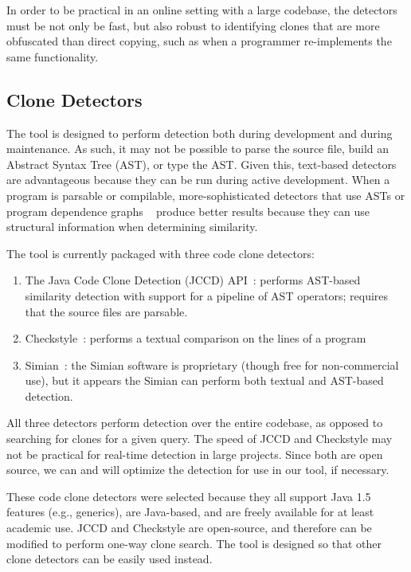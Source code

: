 \documentclass[nocopyrightspace,10pt]{sigplanconf}
\begin{document}
In order to be practical in an online
setting with a large codebase, the detectors must be
not only be fast, but also
robust to identifying clones that are more obfuscated than direct
copying, such as when a programmer re-implements the same
functionality.

\subsection{Clone Detectors}
The tool is designed to perform detection both during development and
during maintenance.  As such, it may not be possible to parse the source
file, build an Abstract Syntax Tree (AST), or type the AST. Given this, text-based detectors
are advantageous because they can be run during active
development. When a program is parsable or compilable,
more-sophisticated detectors that use ASTs or program
dependence graphs ~\cite{LiE2011} produce better results
because they can use structural information when determining
similarity.

\label{sec:detectors}
The tool is currently packaged with three code clone detectors:

\begin{enumerate}
\item The Java Code Clone Detection (JCCD) API~\cite{JCCD}: performs
  AST-based similarity detection with support for a pipeline of AST
  operators; requires that the source files are parsable.
\item Checkstyle~\cite{CheckStyle}: performs a textual comparison on
  the lines of a program
\item Simian~\cite{Simian}: the Simian software is proprietary (though
  free for non-commercial use), but it appears the Simian can perform
  both textual and AST-based detection.
\end{enumerate}

All three detectors perform detection over the entire codebase, as
opposed to searching for clones for a given query. The speed of JCCD
and Checkstyle may not be practical for real-time detection in large
projects. Since both are open source, we can and will optimize the
detection for use in our tool, if necessary.  

These code clone detectors were selected because they all support Java
1.5 features (e.g., generics), are Java-based, and are freely
available for at least academic use. JCCD and Checkstyle are
open-source, and therefore can be modified to perform one-way clone
search. 
The tool is designed so that other clone detectors can be easily used instead.
\end{document}
